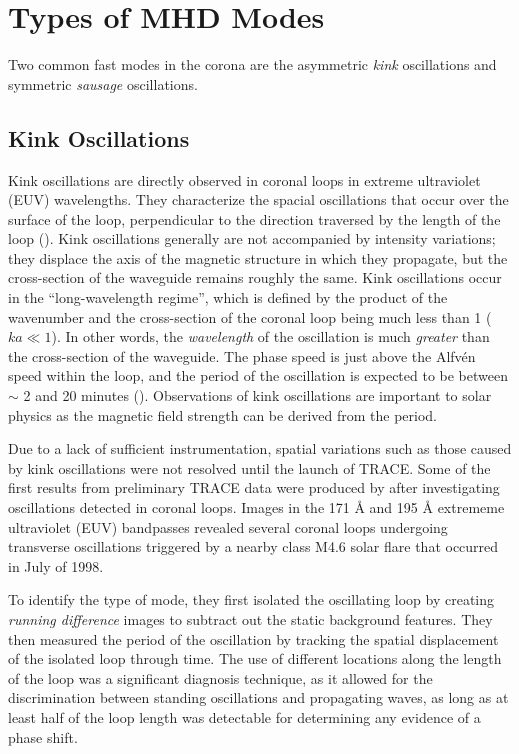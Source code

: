 \documentclass[preprint2]{aastex}
\begin{document}
\section{Types of MHD Modes}\label{topics}
Two common fast modes in the corona are the asymmetric \emph{kink}
oscillations and symmetric \emph{sausage} oscillations.

\subsection{Kink Oscillations}\label{kink}
Kink oscillations are directly observed in coronal loops in extreme
ultraviolet (EUV) wavelengths.
They characterize the spacial oscillations that occur over the surface of
the loop, perpendicular to the direction traversed by the length
of the loop (\cite{Nak}).
Kink oscillations generally are not accompanied by intensity variations;
they displace the axis of the magnetic structure in which they propagate,
but the cross-section of the waveguide remains roughly the same.
Kink oscillations occur in the ``long-wavelength regime'',
which is defined by
the product of the wavenumber and the cross-section of the coronal
loop being much less than 1 ($ka \ll 1$). In other words, the
\emph{wavelength} of the oscillation is much \emph{greater} than the
cross-section of the waveguide.
The phase speed is just above the Alfv\'en speed within the loop,
and the period of the oscillation is expected to be between
$\sim$ 2 and 20 minutes (\cite{Asc}).
Observations of kink oscillations are important to solar physics as
the magnetic field strength can be derived from the period.

Due to a lack of sufficient instrumentation,
spatial variations such as those caused by kink oscillations
were not resolved until the launch of TRACE\@.
Some of the first results from preliminary TRACE data were produced by
\cite{kink_1} after investigating oscillations detected in coronal loops.
Images in the 171 \AA{} and 195 \AA{} extrememe ultraviolet (EUV) bandpasses
revealed several coronal loops undergoing transverse oscillations
triggered by a nearby class M4.6 solar flare that occurred in July of 1998.

To identify the type of mode, they first isolated the oscillating
loop by creating \emph{running difference} images to subtract out
the static background features. They then measured the period
of the oscillation by tracking the spatial displacement of the
isolated loop through time. The use of different locations along the
length of the loop was a significant diagnosis technique, as it
allowed for the discrimination between standing oscillations
and propagating waves, as long as at least half of the loop length
was detectable for determining any evidence of a phase shift.
\end{document}
